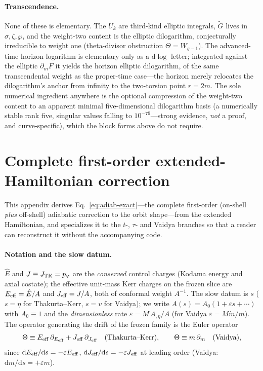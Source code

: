 \documentclass[12pt]{iopart}
\newcommand{\Ehat}{\hat E}
\newcommand{\dd}{\mathrm{d}}
\begin{document}
\paragraph{Transcendence.}
None of these is elementary. The $U_k$ are third-kind elliptic integrals, $\tilde G$
lives in $\sigma,\zeta,\wp$, and the weight-two content is the elliptic dilogarithm,
conjecturally irreducible to weight one (theta-divisor obstruction $\Theta=W_{g-1}$). The
advanced-time horizon logarithm is elementary only as a $\dd\log$ letter; integrated
against the elliptic $\partial_m F$ it yields the horizon elliptic dilogarithm, of the
same transcendental weight as the proper-time case---the horizon merely relocates the
dilogarithm's anchor from infinity to the two-torsion point $r=2m$. The sole
numerical ingredient anywhere is the optional compression of the weight-two content to
an apparent minimal five-dimensional dilogarithm basis (a numerically stable rank five,
singular values falling to $10^{-79}$---strong evidence, \emph{not} a proof, and
curve-specific), which the block forms above do not require.

\clearpage
\section{Complete first-order extended-Hamiltonian correction}
\label{app:firstorder}
This appendix derives Eq.~\eqref{eq:adiab-exact}---the complete first-order (on-shell
\emph{plus} off-shell) adiabatic correction to the orbit shape---from the extended
Hamiltonian, and specializes it to the $t$-, $\tau$- and Vaidya branches so that a
reader can reconstruct it without the accompanying code.

\paragraph{Notation and the slow datum.} $\Ehat$ and $J\equiv J_{\rm TK}=p_\varphi$ are
the \emph{conserved} control charges (Kodama energy and axial costate); the effective
unit-mass Kerr charges on the frozen slice are $E_{\rm eff}=\Ehat/A$ and
$J_{\rm eff}=J/A$, both of conformal weight $A^{-1}$. The slow datum is $s$ ($s=\eta$ for
Thakurta--Kerr, $s=v$ for Vaidya); we write $A(s)=A_0(1+\varepsilon s+\cdots)$ with
$A_0\equiv1$ and the \emph{dimensionless} rate $\varepsilon=M\,A_{,\eta}/A$ (for Vaidya
$\varepsilon=M\dot m/m$). The operator generating the drift of the frozen family is the
Euler operator
\begin{equation}
    \Theta\equiv E_{\rm eff}\,\partial_{E_{\rm eff}}+J_{\rm eff}\,\partial_{J_{\rm eff}}
    \quad(\text{Thakurta--Kerr}),\qquad
    \Theta\equiv m\,\partial_m\quad(\text{Vaidya}),
    \label{eq:theta-op}
\end{equation}
since $\dd E_{\rm eff}/\dd s=-\varepsilon E_{\rm eff}$, $\dd J_{\rm eff}/\dd s=-\varepsilon
J_{\rm eff}$ at leading order (Vaidya: $\dd m/\dd s=+\varepsilon m$).
\end{document}

